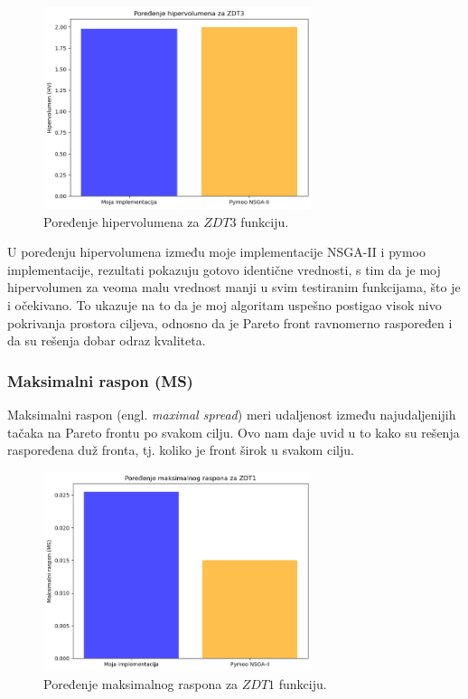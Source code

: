 \documentclass[12pt]{article}
\begin{document}
\begin{figure}[H]
    \centering
    \includegraphics[width=0.7\textwidth]{images/hv_zdt3.png}
    \caption{Poređenje hipervolumena za \( ZDT3 \) funkciju.}
    \label{fig:hv_zdt3}
\end{figure}

U poređenju hipervolumena između moje implementacije NSGA-II i pymoo implementacije, rezultati pokazuju gotovo identične vrednosti, s tim da je moj hipervolumen za veoma malu vrednost manji u svim testiranim funkcijama, što je i očekivano. To ukazuje na to da je moj algoritam uspešno postigao visok nivo pokrivanja prostora ciljeva, odnosno da je Pareto front ravnomerno raspoređen i da su rešenja dobar odraz kvaliteta.

\subsubsection{Maksimalni raspon (MS)}
Maksimalni raspon (engl. \textit{maximal spread}) meri udaljenost između najudaljenijih tačaka na Pareto frontu po svakom cilju. Ovo nam daje uvid u to kako su rešenja raspoređena duž fronta, tj. koliko je front širok u svakom cilju.

\begin{figure}[H]
    \centering
    \includegraphics[width=0.7\textwidth]{images/ms_zdt1.png}
    \caption{Poređenje maksimalnog raspona za \( ZDT1 \) funkciju.}
    \label{fig:ms_zdt1}
\end{figure}
\end{document}
